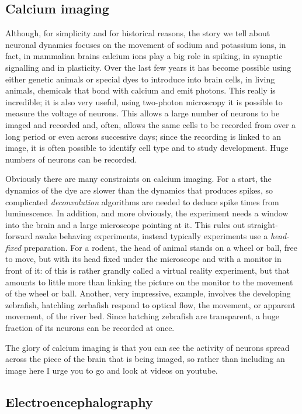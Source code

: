 \documentclass[12pt]{article}
\begin{document}
\subsection*{Calcium imaging}

Although, for simplicity and for historical reasons, the story we tell
about neuronal dynamics focuses on the movement of sodium and
potassium ions, in fact, in mammalian brains calcium ions play a big
role in spiking, in synaptic signalling and in plasticity. Over the
last few years it has become possible using either genetic animals or
special dyes to introduce into brain cells, in living animals,
chemicals that bond with calcium and emit photons. This really is
incredible; it is also very useful, using two-photon microscopy it is
possible to measure the voltage of neurons. This allows a large number
of neurons to be imaged and recorded and, often, allows the same cells
to be recorded from over a long period or even across successive days;
since the recording is linked to an image, it is often possible to
identify cell type and to study development. Huge numbers of neurons
can be recorded.

Obviously there are many constraints on calcium imaging. For a start,
the dynamics of the dye are slower than the dynamics that produces
spikes, so complicated \textsl{deconvolution} algorithms are needed to
deduce spike times from luminescence. In addition, and more obviously,
the experiment needs a window into the brain and a large microscope
pointing at it. This rules out straight-forward awake behaving
experiments, instead typically experiments use a \textsl{head-fixed}
preparation. For a rodent, the head of animal stands on a wheel or
ball, free to move, but with its head fixed under the microscope and
with a monitor in front of it: of this is rather grandly called a
virtual reality experiment, but that amounts to little more than
linking the picture on the monitor to the movement of the wheel or
ball. Another, very impressive, example, involves the developing
zebrafish, hatchling zerbafish respond to optical flow, the movement,
or apparent movement, of the river bed. Since hatching zebrafish are
transparent, a huge fraction of its neurons can be recorded at once.

The glory of calcium imaging is that you can see the activity of
neurons spread across the piece of the brain that is being imaged, so
rather than including an image here I urge you to go and look at
videos on youtube.

\subsection*{Electroencephalography}
\end{document}
